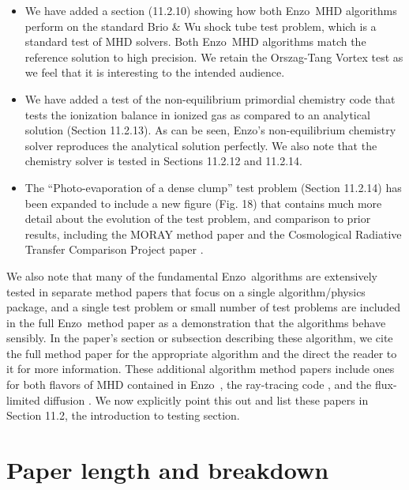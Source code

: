 \documentclass[11pt]{article}
\newcommand{\code}[1]{\textsf{#1}}
\newcommand{\enzo}{\code{Enzo}}
\begin{document}
\begin{itemize}
\item We have added a section (11.2.10) showing how both \enzo\ MHD
  algorithms perform on the standard Brio \& Wu shock tube test
  problem, which is a standard test of MHD solvers.  Both \enzo\ MHD
  algorithms match the reference solution to high precision.  We retain the
  Orszag-Tang Vortex test as we feel that it is interesting to the
  intended audience.

\item We have added a test of the non-equilibrium primordial chemistry code that
  tests the ionization balance in ionized gas as compared to an
  analytical solution (Section 11.2.13).  As can be seen, \enzo's
  non-equilibrium chemistry solver  reproduces the analytical solution perfectly.
  We also note that the chemistry solver is tested in Sections 11.2.12 and 11.2.14.

\item The ``Photo-evaporation of a dense clump'' test problem (Section
  11.2.14) has been expanded to include a new figure (Fig. 18) that
  contains much more detail about the evolution of the test problem,
  and comparison to prior results, including the MORAY method paper
  \citep{Wise11_Moray} and the Cosmological Radiative Transfer
  Comparison Project paper \citep{IlievEtAl2009}.

\end{itemize}

We also note that many of the fundamental \enzo\ algorithms are
extensively tested in separate method papers that focus on a single
algorithm/physics package, and a single test problem or small number
of test problems are included in the full \enzo\ method paper as a
demonstration that the algorithms behave sensibly.  In the paper's
section or subsection
describing these algorithm, we cite the full method paper for the
appropriate algorithm and the direct the reader to it for more
information.  These additional algorithm method papers include ones
for both flavors of MHD contained in \enzo\ \citep{Wang:2009a,
Collins10}, the ray-tracing code \citep{Wise11_Moray}, and the
flux-limited diffusion \citep{ReynoldsHayesPaschosNorman2009}.
We now explicitly point this out and list these papers in Section 
11.2, the introduction to testing section.

\section{Paper length and breakdown}
\end{document}
